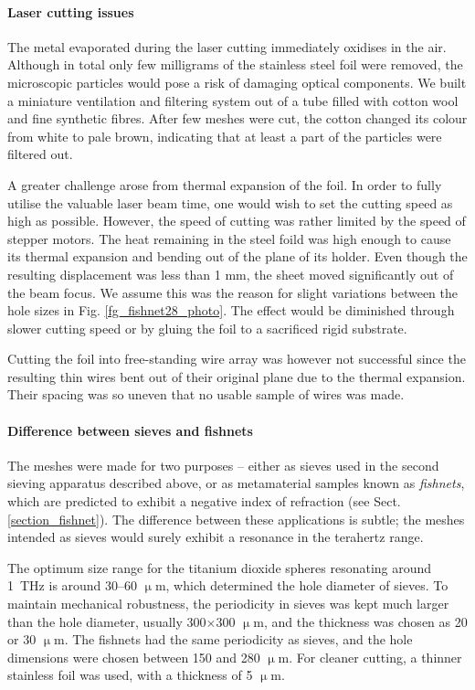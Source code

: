 \paragraph{Laser cutting issues}%
The metal evaporated during the laser cutting immediately oxidises in the air. Although in total only few milligrams of the stainless steel foil were removed, the microscopic particles would pose a risk of damaging optical components. We built a miniature ventilation and filtering system out of a tube filled with cotton wool and fine synthetic fibres. After few meshes were cut, the cotton changed its colour from white to pale brown, indicating that at least a part of the particles were filtered out.

A greater challenge arose from thermal expansion of the foil. In order to fully utilise the valuable laser beam time, one would wish to set the cutting speed as high as possible. However, the speed of cutting was rather limited by the speed of stepper motors. The heat remaining in the steel foild was high enough to cause its thermal expansion and bending out of the plane of its holder. Even though the resulting displacement was less than 1 mm, the sheet moved significantly out of the beam focus. We assume this was the reason for slight variations between the hole sizes in Fig. \ref{fg_fishnet28_photo}. The effect would be diminished through slower cutting speed or by gluing the foil to a sacrificed rigid substrate.

Cutting the foil into free-standing wire array was however not successful since the resulting thin wires bent out of their original plane due to the thermal expansion. Their spacing was so uneven that no usable sample of wires was made.

\paragraph{Difference between sieves and fishnets}%
The meshes were made for two purposes -- either as sieves used in the second sieving apparatus described above, or as metamaterial samples known as \textit{fishnets}, which are predicted to exhibit a negative index of refraction (see Sect. \ref{section_fishnet}). The difference between these applications is subtle; the meshes intended as sieves would surely exhibit a resonance in the terahertz range. 

The optimum  size range for the titanium dioxide spheres resonating around 1~THz is around 30--60 $\upmu$m, which determined the hole diameter of sieves. To maintain mechanical robustness, the periodicity in sieves was kept much larger than the hole diameter, usually 300$\times$300 $\upmu$m, and the thickness was chosen as 20 or 30 $\upmu$m.
The fishnets had the same periodicity as sieves, and the hole dimensions were chosen between 150 and 280 $\upmu$m. 
For cleaner cutting, a thinner stainless foil was used, with a thickness of 5 $\upmu$m.

